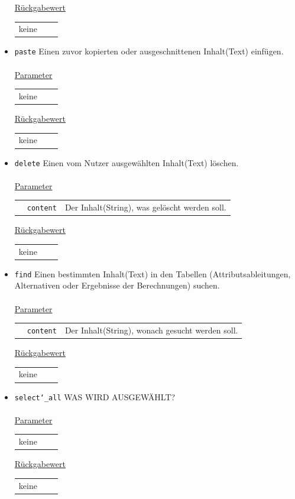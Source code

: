 \documentclass{article}
\begin{document}
\begin{itemize}
\underline{{Rückgabewert}}
\begin{tabular}{lll}
keine
\end{tabular}

\item \texttt{paste} \newline Einen zuvor kopierten oder ausgeschnittenen Inhalt(Text) einfügen.
\\\\

\underline{{Parameter}} 
\begin{tabular}{lll}
keine
\end{tabular}

\underline{{Rückgabewert}}
\begin{tabular}{lll}
keine
\end{tabular}

\item \texttt{delete} \newline Einen vom Nutzer ausgewählten Inhalt(Text) löschen.
\\\\
\underline{{Parameter}} 
\begin{tabular}{lll}
& \texttt{content} & Der Inhalt(String), was gelöscht werden soll. \\
\end{tabular}

\underline{{Rückgabewert}}
\begin{tabular}{lll}
keine
\end{tabular}

\item \texttt{find} \newline Einen bestimmten Inhalt(Text) in den Tabellen (Attributsableitungen, Alternativen oder Ergebnisse der Berechnungen) suchen.
\\\\
\underline{{Parameter}} 
\begin{tabular}{lll}
 & \texttt{content} & Der Inhalt(String), wonach gesucht werden soll. \\
\end{tabular}

\underline{{Rückgabewert}}
\begin{tabular}{lll}
 keine
\end{tabular}

\item \texttt{select\char`_all} \newline WAS WIRD AUSGEWÄHLT?
\\\\
\underline{{Parameter}} 
\begin{tabular}{lll}
keine
\end{tabular}

\underline{{Rückgabewert}}
\begin{tabular}{lll}
 keine
\end{tabular}
\end{itemize}
\end{document}
